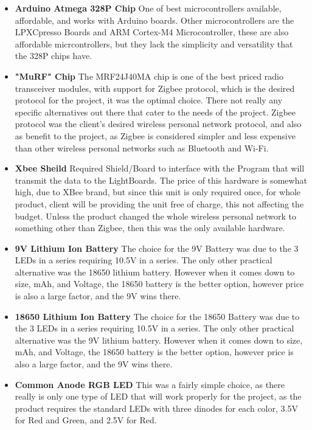 \documentclass[12pt]{article}
\begin{document}
{{{{{{{		%
		{\renewcommand\labelitemi{}
			\begin{itemize}
				\item \textbf{Arduino Atmega 328P Chip}
				One of best microcontrollers available, affordable, and works with Arduino boards. Other microcontrollers are the LPXCpresso Boards and ARM Cortex-M4 Microcontroller, these are also affordable micrcontrollers, but they lack the simplicity and versatility that the 328P chips have. 
				\item \textbf{"MuRF" Chip}
				The MRF24J40MA chip is one of the best priced radio transceiver modules, with support for Zigbee protocol, which is the desired protocol for the project, it was the optimal choice. There not really any specific alternatives out there that cater to the needs of the project. Zigbee protocol was the client's desired wireless personal network protocol, and also as benefit to the project, as Zigbee is considered simpler and less expensive than other wireless personal networks such as Bluetooth and Wi-Fi.
				\item \textbf{Xbee Sheild}
				Required Shield/Board to interface with the Program that will transmit the data to the LightBoards. The price of this hardware is somewhat high, due to XBee brand, but since this unit is only required once, for whole product, client will be providing the unit free of charge, this not affecting the budget. Unless the product changed the whole wireless personal network to something other than Zigbee, then this was the only available hardware. 
				\item \textbf{9V Lithium Ion Battery}
				The choice for the 9V Battery was due to the 3 LEDs in a series requiring 10.5V in a series. The only other practical alternative was the 18650 lithium battery. However when it comes down to size, mAh, and Voltage, the 18650 battery is the better option, however price is also a large factor, and the 9V wins there.
				\item \textbf{18650 Lithium Ion Battery}
				The choice for the 18650 Battery was due to the 3 LEDs in a series requiring 10.5V in a series. The only other practical alternative was the 9V lithium battery. However when it comes down to size, mAh, and Voltage, the 18650 battery is the better option, however price is also a large factor, and the 9V wins there.
				\item \textbf{Common Anode RGB LED}
				This was a fairly simple choice, as there really is only one type of LED that will work properly for the project, as the product requires the standard LEDs with three dinodes for each color, 3.5V for Red and Green, and 2.5V for Red.

\end{itemize}}}}}}}}}
\end{document}
